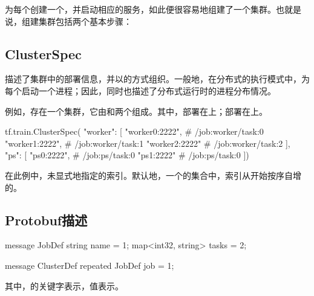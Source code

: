 \begin{content}

为每个创建一个，并启动相应的服务，如此便很容易地组建了一个集群。也就是说，组建集群包括两个基本步骤：

\begin{enum}
\end{enum}

\subsection{ClusterSpec}

描述了集群中的部署信息，并以的方式组织。一般地，在分布式的执行模式中，为每个启动一个进程；因此，同时也描述了分布式运行时的进程分布情况。

例如，存在一个集群，它由和两个组成。其中，部署在上；部署在上。

\begin{leftbar}
\begin{python}
tf.train.ClusterSpec({
  "worker": [
    "worker0:2222",   # /job:worker/task:0
    "worker1:2222",   # /job:worker/task:1
    "worker2:2222"    # /job:worker/task:2
  ],  
  "ps": [
    "ps0:2222",       # /job:ps/task:0
    "ps1:2222"        # /job:ps/task:0
  ]})
\end{python}
\end{leftbar}

在此例中，未显式地指定的索引。默认地，一个的集合中，索引从开始按序自增的。

\subsection{Protobuf描述}

\begin{leftbar}
\begin{python}
message JobDef {
  string name = 1;
  map<int32, string> tasks = 2;
}

message ClusterDef {
  repeated JobDef job = 1;
}
\end{python}
\end{leftbar}

其中，的关键字表示，值表示。

\end{content}

